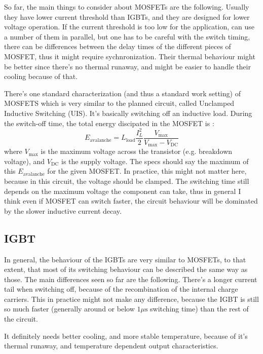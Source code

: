 \documentclass[12pt,a4paper]{article}
\begin{document}
So far, the main things to consider about MOSFETs are the following. Usually they have lower current threshold than IGBTs, and they are designed for lower voltage operation. If the current threshold is too low for the application, can use a number of them in parallel, but one has to be careful with the switch timing, there can be differences between the delay times of the different pieces of MOSFET, thus it might require sychnronization. Their thermal behaviour might be better since there's no thermal runaway, and might be easier to handle their cooling because of that.

There's one standard characterization (and thus a standard work setting) of MOSFETS which is very similar to the planned circuit, called Unclamped Inductive Switching (UIS). It's basically switching off an inductive load. During the switch-off time, the total energy discipated in the MOSFET is \cite{Linder2006}:
\begin{equation}
E_{\mathrm{avalanche}} = L_{\mathrm{load}} \frac{I_L^2}{2} \frac{V_{\mathrm{max}}}{V_{\mathrm{max}}-V_{\mathrm{DC}}}
\end{equation}
where $V_{\mathrm{max}}$ is the maximum voltage across the transistor (e.g. breakdown voltage), and $V_{\mathrm{DC}}$ is the supply voltage. The specs should say the maximum of this $E_{\mathrm{avalanche}}$ for the given MOSFET. In practice, this might not matter here, because in this circuit, the voltage should be clamped. The switching time still depends on the maximum voltage the component can take, thus in general I think even if MOSFET can switch faster, the circuit behaviour will be dominated by the slower inductive current decay.

\subsection{IGBT}

In general, the behaviour of the IGBTs are very similar to MOSFETs, to that extent, that most of its switching behaviour can be described the same way as those. The main differences seen so far are the following. There's a longer current tail when switching off, because of the recombination of the internal charge carriers. This in practice might not make any difference, because the IGBT is still so much faster (generally around or below $1 \mu \mathrm{s}$ switching time) than the rest of the circuit.

It definitely needs better cooling, and more stable temperature, because of it's thermal runaway, and temperature dependent output characteristics.
\end{document}
